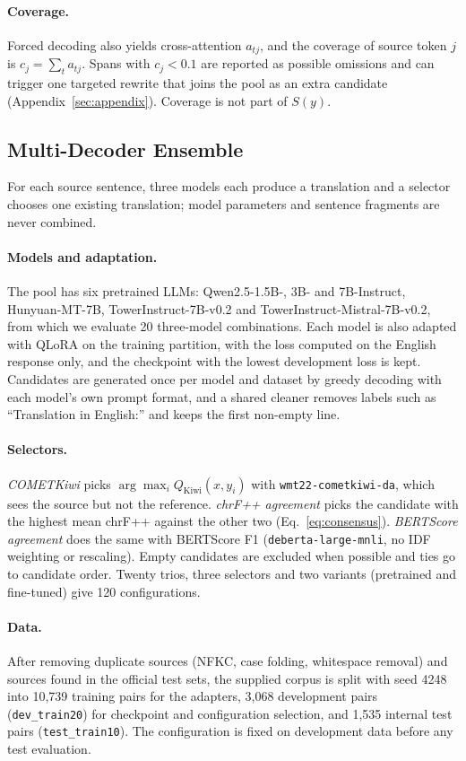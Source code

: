 \documentclass[11pt]{article}
\begin{document}
\paragraph{Coverage.}
Forced decoding also yields cross-attention $a_{tj}$, and the coverage of source token $j$ is $c_j=\sum_t a_{tj}$. Spans with $c_j<0.1$ are reported as possible omissions and can trigger one targeted rewrite that joins the pool as an extra candidate (Appendix~\ref{sec:appendix}). Coverage is not part of $S(y)$.

\subsection{Multi-Decoder Ensemble}
\label{subsec:ensemble}
For each source sentence, three models each produce a translation and a selector chooses one existing translation; model parameters and sentence fragments are never combined.

\paragraph{Models and adaptation.}
The pool has six pretrained LLMs: Qwen2.5-1.5B-, 3B- and 7B-Instruct, Hunyuan-MT-7B, TowerInstruct-7B-v0.2 and TowerInstruct-Mistral-7B-v0.2, from which we evaluate 20 three-model combinations. Each model is also adapted with QLoRA on the training partition, with the loss computed on the English response only, and the checkpoint with the lowest development loss is kept. Candidates are generated once per model and dataset by greedy decoding with each model's own prompt format, and a shared cleaner removes labels such as ``Translation in English:'' and keeps the first non-empty line.

\paragraph{Selectors.}
\emph{COMETKiwi} picks $\arg\max_i Q_{\mathrm{Kiwi}}(x,y_i)$ with \texttt{wmt22-cometkiwi-da}, which sees the source but not the reference. \emph{chrF++ agreement} picks the candidate with the highest mean chrF++ against the other two (Eq.~\ref{eq:consensus}). \emph{BERTScore agreement} does the same with BERTScore F1 (\texttt{deberta-large-mnli}, no IDF weighting or rescaling). Empty candidates are excluded when possible and ties go to candidate order. Twenty trios, three selectors and two variants (pretrained and fine-tuned) give 120 configurations.

\paragraph{Data.}
After removing duplicate sources (NFKC, case folding, whitespace removal) and sources found in the official test sets, the supplied corpus is split with seed 4248 into 10,739 training pairs for the adapters, 3,068 development pairs (\texttt{dev\_train20}) for checkpoint and configuration selection, and 1,535 internal test pairs (\texttt{test\_train10}). The configuration is fixed on development data before any test evaluation.
\end{document}
